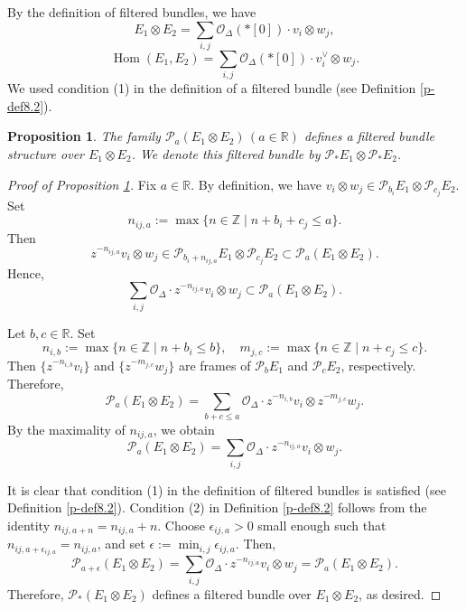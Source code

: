 \documentclass[12pt,twoside]{amsart}
\DeclareMathOperator{\Hom}{Hom}
\newtheorem{prop}[thm]{Proposition}
\theoremstyle{definition}
\begin{document}
By the definition of filtered bundles, we have
\[
E_1 \otimes E_2 = \sum_{i, j} \mathcal{O}_\Delta(*[0]) \cdot v_i \otimes w_j,
\]
\[
\Hom(E_1, E_2) = \sum_{i, j} \mathcal{O}_\Delta(*[0]) \cdot v_i^\vee \otimes w_j.
\]
We used condition (1) in the definition of a filtered 
bundle (see Definition \ref{p-def8.2}).

\begin{prop}\label{p-prop14.3}
The family $\mathcal{P}_a(E_1 \otimes E_2)\,(a \in \mathbb{R})$ 
defines a filtered bundle structure over $E_1 \otimes E_2$. 
We denote this filtered bundle by 
$\mathcal{P}_\ast E_1 \otimes \mathcal{P}_\ast E_2$.
\end{prop}

\begin{proof}[Proof of Proposition \ref{p-prop14.3}]
Fix $a \in \mathbb{R}$. By definition, we have 
$v_i \otimes w_j \in \mathcal{P}_{b_i} E_1 \otimes \mathcal{P}_{c_j} E_2$. Set
\[
n_{ij,a} := \max\{ n \in \mathbb{Z} \mid n + b_i + c_j \leq a \}.
\]
Then
\[
z^{-n_{ij,a}} v_i \otimes w_j \in 
\mathcal{P}_{b_i + n_{ij,a}} E_1 \otimes 
\mathcal{P}_{c_j} E_2 \subset \mathcal{P}_a(E_1 \otimes E_2).
\]
Hence, 
\[
\sum_{i,j} \mathcal{O}_\Delta \cdot z^{-n_{ij,a}} 
v_i \otimes w_j \subset \mathcal{P}_a(E_1 \otimes E_2).
\]

Let $b, c \in \mathbb{R}$. Set
\[
n_{i,b} := \max\{ n \in \mathbb{Z} 
\mid n + b_i \leq b \}, \quad m_{j,c} := \max\{ n \in \mathbb{Z} \mid n + c_j \leq c \}.
\]
Then $\{ z^{-n_{i,b}} v_i \}$ and $\{ z^{-m_{j,c}} w_j \}$ 
are frames of $\mathcal{P}_b E_1$ and $\mathcal{P}_c E_2$, respectively. Therefore,
\[
\mathcal{P}_a(E_1 \otimes E_2) = 
\sum_{b + c \leq a} \mathcal{O}_\Delta \cdot z^{-n_{i,b}} v_i \otimes z^{-m_{j,c}} w_j.
\]
By the maximality of $n_{ij,a}$, we obtain
\[
\mathcal{P}_a(E_1 \otimes E_2) = 
\sum_{i,j} \mathcal{O}_\Delta \cdot z^{-n_{ij,a}} v_i \otimes w_j.
\]

It is clear that condition (1) in the 
definition of filtered bundles is satisfied (see Definition \ref{p-def8.2}). 
Condition (2) in Definition \ref{p-def8.2} follows from the 
identity $n_{ij,a+n} = n_{ij,a} + n$. 
Choose $\epsilon_{ij,a} > 0$ small enough 
such that $n_{ij,a + \epsilon_{ij,a}} = n_{ij,a}$, 
and set $\epsilon := \min_{i,j} \epsilon_{ij,a}$. Then,
\[
\mathcal{P}_{a+\epsilon}(E_1 \otimes E_2) = 
\sum_{i,j} \mathcal{O}_\Delta \cdot z^{-n_{ij,a}} 
v_i \otimes w_j = \mathcal{P}_a(E_1 \otimes E_2).
\]
Therefore, $\mathcal{P}_\ast(E_1 \otimes E_2)$ 
defines a filtered bundle over $E_1 \otimes E_2$, as desired.
\end{proof}
\end{document}
